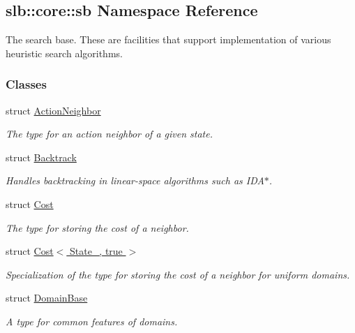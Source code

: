 \hypertarget{namespaceslb_1_1core_1_1sb}{}\subsection{slb\+:\+:core\+:\+:sb Namespace Reference}
\label{namespaceslb_1_1core_1_1sb}


The search base. These are facilities that support implementation of various heuristic search algorithms.  


\subsubsection*{Classes}
\begin{DoxyCompactItemize}
\item 
struct \hyperlink{structslb_1_1core_1_1sb_1_1ActionNeighbor}{Action\+Neighbor}
\begin{DoxyCompactList}\small\item\em The type for an action neighbor of a given state. \end{DoxyCompactList}\item 
struct \hyperlink{structslb_1_1core_1_1sb_1_1Backtrack}{Backtrack}
\begin{DoxyCompactList}\small\item\em Handles backtracking in linear-\/space algorithms such as I\+D\+A$\ast$. \end{DoxyCompactList}\item 
struct \hyperlink{structslb_1_1core_1_1sb_1_1Cost}{Cost}
\begin{DoxyCompactList}\small\item\em The type for storing the cost of a neighbor. \end{DoxyCompactList}\item 
struct \hyperlink{structslb_1_1core_1_1sb_1_1Cost_3_01State___00_01true_01_4}{Cost$<$ State\+\_\+, true $>$}
\begin{DoxyCompactList}\small\item\em Specialization of the type for storing the cost of a neighbor for uniform domains. \end{DoxyCompactList}\item 
struct \hyperlink{structslb_1_1core_1_1sb_1_1DomainBase}{Domain\+Base}
\begin{DoxyCompactList}\small\item\em A type for common features of domains. \end{DoxyCompactList}\item 

\end{DoxyCompactItemize}
